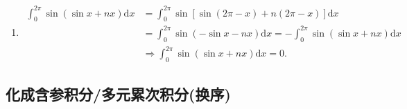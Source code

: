 \documentclass[../../main.tex]{subfiles}
\begin{document}
\begin{solution}
\begin{enumerate}
\item\begin{align*}
\int_0^{2\pi}{\sin \left( \sin x+nx \right) \mathrm{d}x}&=\int_0^{2\pi}{\sin \left[ \sin \left( 2\pi -x \right) +n\left( 2\pi -x \right) \right] \mathrm{d}x}
\\
&=\int_0^{2\pi}{\sin \left( -\sin x-nx \right) \mathrm{d}x}=-\int_0^{2\pi}{\sin \left( \sin x+nx \right) \mathrm{d}x}
\\
&\Longrightarrow \int_0^{2\pi}{\sin \left( \sin x+nx \right) \mathrm{d}x}=0.
\end{align*} 
\end{enumerate}
\end{solution}



\subsection{化成含参积分/多元累次积分(换序)}
\end{document}
